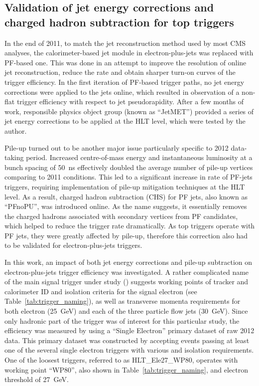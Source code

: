 \subsection{Validation of jet energy corrections and charged hadron subtraction for top triggers}
\label{ss:JEC_PFnoPU_validation}
In the end of 2011, to match the jet reconstruction method used by most CMS analyses, the calorimeter-based jet module
in electron-plus-jets was replaced with PF-based one. This was done in an attempt to improve the \pt resolution of
online jet reconstruction, reduce the rate and obtain sharper turn-on curves of the trigger efficiency. In the first
iteration of PF-based trigger paths, no jet energy corrections were applied to the jets online, which resulted in
observation of a non-flat trigger efficiency with respect to jet pseudorapidity. After a few months of work, responsible
physics object group (known as ``JetMET'') provided a series of jet energy corrections to be applied at the HLT level,
which were tested by the author.

Pile-up turned out to be another major issue particularly specific to 2012 data-taking period. Increased centre-of-mass
energy and instantaneous luminosity at a bunch spacing of \SI{50}{\ns} effectively doubled the average number of pile-up
vertices comparing to 2011 conditions. This led to a significant increase in rate of PF-jets triggers, requiring
implementation of pile-up mitigation techniques at the HLT level. As a result, charged hadron subtraction (CHS) for PF
jets, also known as ``PFnoPU'', was introduced online. As the name suggests, it essentially removes the charged hadrons
associated with secondary vertices from PF candidates, which helped to reduce the trigger rate dramatically. As top
triggers operate with PF jets, they were greatly affected by pile-up, therefore this correction also had to be validated
for electron-plus-jets triggers.


In this work, an impact of both jet energy corrections and pile-up subtraction on electron-plus-jets trigger efficiency
was investigated. A rather complicated name of the main signal trigger under study (\HLTThreeCentralPFJet) suggests
working points of tracker and calorimeter ID and isolation criteria for the signal electron (see
Table~\ref{tab:trigger_naming}), as well as transverse momenta requirements for both electron (\SI{25}{\GeV}) and each
of the three particle flow jets (\SI{30}{\GeV}). Since only hadronic part of the trigger was of interest for this
particular study, the efficiency was measured by using a ``Single Electron'' primary dataset of raw 2012 data. This
primary dataset was constructed by accepting events passing at least one of the several single electron triggers with
various \pt and isolation requirements. One of the loosest triggers, referred to as HLT\_Ele27\_WP80, operates with
working point ``WP80'', also shown in Table~\ref{tab:trigger_naming}, and electron \pt threshold of \SI{27}{\GeV}.

